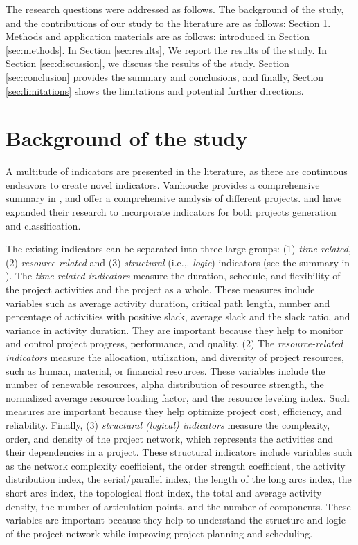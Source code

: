 \documentclass[preprint,
3p]{elsarticle} %
\begin{document}
The research questions were addressed as follows. The background of the
study, and the contributions of our study to the literature are as
follows: Section \ref{sec:background}. Methods and application materials
are as follows: introduced in Section \ref{sec:methods}. In Section
\ref{sec:results}, We report the results of the study. In Section
\ref{sec:discussion}, we discuss the results of the study. Section
\ref{sec:conclusion} provides the summary and conclusions, and finally,
Section \ref{sec:limitations} shows the limitations and potential
further directions.

\section{Background of the study}\label{sec:background}

A multitude of indicators are presented in the literature, as there are
continuous endeavors to create novel indicators. Vanhoucke provides a
comprehensive summary in \citet{vanhoucke2016overview}, and
\citet{browning2010resource} offer a comprehensive analysis of different
projects. \citet{van2020resource} and \citet{VANEYNDE2022853} have
expanded their research to incorporate indicators for both projects
generation and classification.

The existing indicators can be separated into three large groups: (1)
\emph{time-related}, (2) \emph{resource-related} and (3)
\emph{structural} (i.e.,. \emph{logic}) indicators (see the summary in
\citet{van2023summary}). The \emph{time-related indicators} measure the
duration, schedule, and flexibility of the project activities and the
project as a whole. These measures include variables such as average
activity duration, critical path length, number and percentage of
activities with positive slack, average slack and the slack ratio, and
variance in activity duration. They are important because they help to
monitor and control project progress, performance, and quality. (2) The
\emph{resource-related indicators} measure the allocation, utilization,
and diversity of project resources, such as human, material, or
financial resources. These variables include the number of renewable
resources, alpha distribution of resource strength, the normalized
average resource loading factor, and the resource leveling index. Such
measures are important because they help optimize project cost,
efficiency, and reliability. Finally, (3) \emph{structural (logical)
indicators} measure the complexity, order, and density of the project
network, which represents the activities and their dependencies in a
project. These structural indicators include variables such as the
network complexity coefficient, the order strength coefficient, the
activity distribution index, the serial/parallel index, the length of
the long arcs index, the short arcs index, the topological float index,
the total and average activity density, the number of articulation
points, and the number of components. These variables are important
because they help to understand the structure and logic of the project
network while improving project planning and scheduling.
\end{document}
